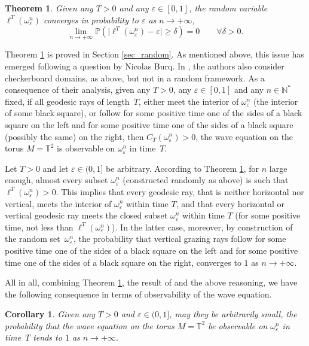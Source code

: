 \documentclass[JEP,XML,SOM,Unicode, NoEqCountersInSection,NoFloatCountersInSection,published]{cedram}
\def\N{\mathbb{N}}
\newtheorem{theorem}{Theorem}
\newtheorem{corollary}{Corollary}
\theoremstyle{definition}
\begin{document}
\begin{theorem}\label{thm_random}
Given any $T>0$ and any $ \varepsilon \in [0, 1]$, the random variable $\ell^T(\omega_\varepsilon^n)$ converges in probability to $\varepsilon$ as $n\to +\infty$, \ie
\[
\lim_{n\to +\infty}\mathbb{P}\left(\vert\ell^T(\omega_\varepsilon^n) - \varepsilon \vert \geq \delta\right) = 0 \qquad \forall \delta>0.
\]
\end{theorem}

Theorem \ref{thm_random} is proved in Section \ref{sec_random}. As mentioned above, this issue has emerged following a question by Nicolas Burq.
In \cite{Burq2017,BurqGerard2018}, the authors also consider checkerboard domains, as above, but not in a random framework. As a consequence of their analysis, given any $T>0$, any $\varepsilon\in[0,1]$ and any $n\in\N^*$ fixed, if all geodesic rays of length~$T$, either meet the interior of $\omega_\varepsilon^n$ (\ie the interior of some black square), or follow for some positive time one of the sides of a black square on the left and for some positive time one of the sides of a black square (possibly the same) on the right, then $C_T(\omega_\varepsilon^n)>0$, \ie the wave equation on the torus $M=\mathbb{T}^2$ is observable on $\omega_\varepsilon^n$ in time~$T$.

Let $T>0$ and let $\varepsilon \in(0,1]$ be arbitrary. According to Theorem \ref{thm_random}, for $n$ large enough, almost every subset $\omega_\varepsilon^n$ (constructed randomly as above) is such that $\ell^T(\omega_\varepsilon^n)>0$. This implies that every geodesic ray, that is neither horizontal nor vertical, meets the interior of $\omega_\varepsilon^n$ within time $T$, and that every horizontal or vertical geodesic ray meets the closed subset $\omega_\varepsilon^n$ within time $T$ (for some positive time, not less than $\ell^T(\omega_\varepsilon^n)$). In the latter case, moreover, by construction of the random set~$\omega_\varepsilon^n$, the probability that vertical grazing rays follow for some positive time one of the sides of a black square on the left and for some positive time one of the sides of a black square on the right, converges to $1$ as $n\rightarrow +\infty$.

All in all, combining Theorem \ref{thm_random}, the result of \cite{Burq2017,BurqGerard2018} and the above reasoning, we have the following consequence in terms of observability of the wave equation.

\begin{corollary}
Given any $T>0$ and $\varepsilon \in(0,1]$, may they be arbitrarily small, the probability that the wave equation on the torus $M=\mathbb{T}^2$ be observable on $\omega_\varepsilon^n$ in time~$T$ tends to $1$ as $n\rightarrow+\infty$.
\end{corollary}
\end{document}
